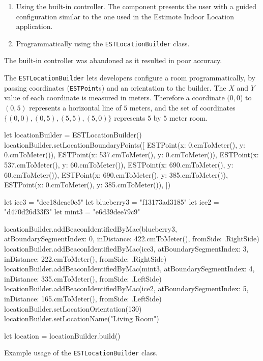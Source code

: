 \begin{enumerate}
\item Using the built-in controller. The component presents the user with a guided configuration similar to the one used in the Estimote Indoor Location application.
\item Programmatically using the \texttt{ESTLocationBuilder} class.
\end{enumerate}

The built-in controller was abandoned as it resulted in poor accuracy.

The \texttt{ESTLocationBuilder} lets developers configure a room programmatically, 
by passing coordinates (\texttt{ESTPoint}s) and an orientation to the builder. 
The $X$ and $Y$ value of each coordinate is measured in meters. 
Therefore a coordinate $(0, 0$) to $(0, 5)$ represents a horizontal line of $5$ meters, 
and the set of coordinates $\{(0,0),(0,5),(5,5),(5,0)\}$ represents $5$ by $5$ meter room.

\begin{listing}
\begin{swiftcode}
        let locationBuilder = ESTLocationBuilder()
        locationBuilder.setLocationBoundaryPoints([
            ESTPoint(x: 0.cmToMeter(), y: 0.cmToMeter()),
            ESTPoint(x: 537.cmToMeter(), y: 0.cmToMeter()),
            ESTPoint(x: 537.cmToMeter(), y: 60.cmToMeter()),
            ESTPoint(x: 690.cmToMeter(), y: 60.cmToMeter()),
            ESTPoint(x: 690.cmToMeter(), y: 385.cmToMeter()),
            ESTPoint(x: 0.cmToMeter(), y: 385.cmToMeter()),
        ])
        
        let ice3 = "dec18deac0c5"
        let blueberry3 = "f13173ad3185"
        let ice2 = "d470d26d33f3"
        let mint3 = "e6d39dee79c9"
        
        locationBuilder.addBeaconIdentifiedByMac(blueberry3, atBoundarySegmentIndex: 0, inDistance: 422.cmToMeter(), fromSide: .RightSide)
        locationBuilder.addBeaconIdentifiedByMac(ice3, atBoundarySegmentIndex: 3, inDistance: 222.cmToMeter(), fromSide: .RightSide)
        locationBuilder.addBeaconIdentifiedByMac(mint3, atBoundarySegmentIndex: 4, inDistance: 335.cmToMeter(), fromSide: .LeftSide)
        locationBuilder.addBeaconIdentifiedByMac(ice2, atBoundarySegmentIndex: 5, inDistance: 165.cmToMeter(), fromSide: .LeftSide)
        locationBuilder.setLocationOrientation(130)
        locationBuilder.setLocationName("Living Room")
        
        let location = locationBuilder.build()
\end{swiftcode}
\caption{Example usage of the \texttt{ESTLocationBuilder} class.}
\label{lst:estlocationbuilder}
\end{listing}


